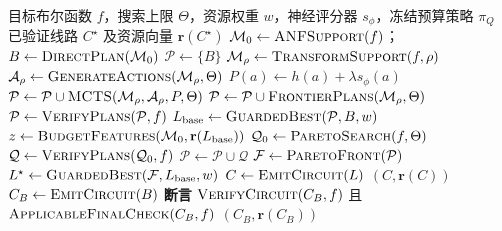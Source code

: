 \algrenewcommand{}
\algrenewcommand{}
\algrenewcommand{}
\algrenewcommand{}
\algrenewcommand{}
\algrenewcommand{}
\algrenewcommand{}
\algrenewcommand{}
\algrenewcommand{}
\begin{algorithm}[H]
\caption{带强化学习 Pareto 预算控制的 Resource-NMCTS。}
\label{alg:resource-nmcts-zh}
\footnotesize
\begin{algorithmic}[1]
\Require 目标布尔函数 $f$，搜索上限 $\Theta$，资源权重 $w$，神经评分器 $s_\phi$，冻结预算策略 $\pi_Q$
\Ensure 已验证线路 $C^\star$ 及资源向量 $\mathbf{r}(C^\star)$
\State $\mathcal{M}_0\gets\Call{ANFSupport}{f}$；$B\gets\Call{DirectPlan}{\mathcal{M}_0}$
\State $\mathcal{P}\gets\{B\}$ 
  \State $\mathcal{M}_\rho\gets\Call{TransformSupport}{f,\rho}$
  \State $\mathcal{A}_\rho\gets\Call{GenerateActions}{\mathcal{M}_\rho,\Theta}$ 
    \State $P(a)\gets h(a)+\lambda s_\phi(a)$
  \EndFor
  \State $\mathcal{P}\gets\mathcal{P}\cup\Call{MCTS}{\mathcal{M}_\rho,\mathcal{A}_\rho,P,\Theta}$
  \State $\mathcal{P}\gets\mathcal{P}\cup\Call{FrontierPlans}{\mathcal{M}_\rho,\Theta}$
\EndFor
\State $\mathcal{P}\gets\Call{VerifyPlans}{\mathcal{P},f}$ 
\State $L_{\mathrm{base}}\gets\Call{GuardedBest}{\mathcal{P},B,w}$
\State $z\gets\Call{BudgetFeatures}{\mathcal{M}_0,\mathbf{r}(L_{\mathrm{base}})}$
  \State $\mathcal{Q}_0\gets\Call{ParetoSearch}{f,\Theta}$
  \State $\mathcal{Q}\gets\Call{VerifyPlans}{\mathcal{Q}_0,f}$
  \State $\mathcal{P}\gets\mathcal{P}\cup\mathcal{Q}$
\EndIf
\State $\mathcal{F}\gets\Call{ParetoFront}{\mathcal{P}}$
\State $L^\star\gets\Call{GuardedBest}{\mathcal{F},L_{\mathrm{base}},w}$
  \State $C\gets\Call{EmitCircuit}{L}$ 
    \State \Return $(C,\mathbf{r}(C))$
\EndIf
\EndFor
\State $C_B\gets\Call{EmitCircuit}{B}$
\State \textbf{断言} $\Call{VerifyCircuit}{C_B,f}$ 且 $\Call{ApplicableFinalCheck}{C_B,f}$
\State \Return $(C_B,\mathbf{r}(C_B))$ 
\end{algorithmic}
\end{algorithm}
